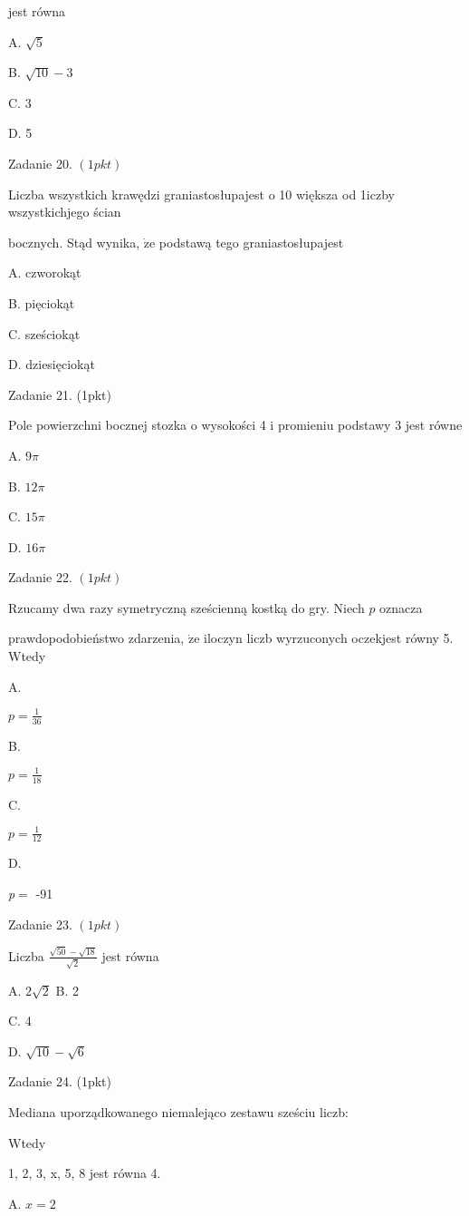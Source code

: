 \documentclass[a4paper,12pt]{article}
\begin{document}
jest równa

A. $\sqrt{5}$

B. $\sqrt{10}-3$

C. 3

D. 5

Zadanie 20. $(1pkt)$

Liczba wszystkich krawędzi graniastosłupajest o 10 większa od 1iczby wszystkichjego ścian

bocznych. Stąd wynika, $\dot{\mathrm{z}}\mathrm{e}$ podstawą tego graniastosłupajest

A. czworokąt

B. pięciokąt

C. sześciokąt

D. dziesięciokąt

Zadanie 21. (1pkt)

Pole powierzchni bocznej stozka o wysokości 4 i promieniu podstawy 3 jest równe

A. $ 9\pi$

B. $ 12\pi$

C. $ 15\pi$

D. $ 16\pi$

Zadanie 22. $(1pkt)$

Rzucamy dwa razy symetryczną sześcienną kostką do gry. Niech $p$ oznacza

prawdopodobieństwo zdarzenia, $\dot{\mathrm{z}}\mathrm{e}$ iloczyn liczb wyrzuconych oczekjest równy 5. Wtedy

A.

$p=\displaystyle \frac{1}{36}$

B.

$p=\displaystyle \frac{1}{18}$

C.

$p=\displaystyle \frac{1}{12}$

D.

{\it p}$=$ -91

Zadanie 23. $(1pkt)$

Liczba $\displaystyle \frac{\sqrt{50}-\sqrt{18}}{\sqrt{2}}$ jest równa

A. $2\sqrt{2}$ B. 2

C. 4

D. $\sqrt{10}-\sqrt{6}$

Zadanie 24. (1pkt)

Mediana uporządkowanego niemalejąco zestawu sześciu liczb:

Wtedy

1, 2, 3, x, 5, 8 jest równa 4.

A. $x=2$
\end{document}
